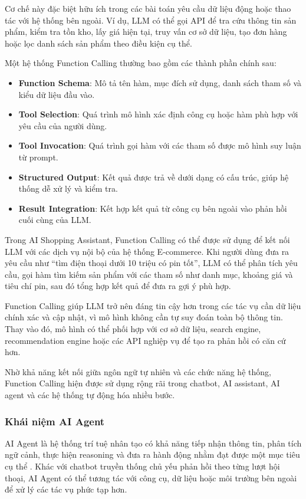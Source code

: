 Cơ chế này đặc biệt hữu ích trong các bài toán yêu cầu dữ liệu động hoặc thao tác với hệ thống bên ngoài. Ví dụ, LLM có thể gọi API để tra cứu thông tin sản phẩm, kiểm tra tồn kho, lấy giá hiện tại, truy vấn cơ sở dữ liệu, tạo đơn hàng hoặc lọc danh sách sản phẩm theo điều kiện cụ thể.

Một hệ thống Function Calling thường bao gồm các thành phần chính sau:

\begin{itemize}
    \item \textbf{Function Schema}: Mô tả tên hàm, mục đích sử dụng, danh sách tham số và kiểu dữ liệu đầu vào.
    \item \textbf{Tool Selection}: Quá trình mô hình xác định công cụ hoặc hàm phù hợp với yêu cầu của người dùng.
    \item \textbf{Tool Invocation}: Quá trình gọi hàm với các tham số được mô hình suy luận từ prompt.
    \item \textbf{Structured Output}: Kết quả được trả về dưới dạng có cấu trúc, giúp hệ thống dễ xử lý và kiểm tra.
    \item \textbf{Result Integration}: Kết hợp kết quả từ công cụ bên ngoài vào phản hồi cuối cùng của LLM.
\end{itemize}

Trong AI Shopping Assistant, Function Calling có thể được sử dụng để kết nối LLM với các dịch vụ nội bộ của hệ thống E-commerce. Khi người dùng đưa ra yêu cầu như ``tìm điện thoại dưới 10 triệu có pin tốt'', LLM có thể phân tích yêu cầu, gọi hàm tìm kiếm sản phẩm với các tham số như danh mục, khoảng giá và tiêu chí pin, sau đó tổng hợp kết quả để đưa ra gợi ý phù hợp.

Function Calling giúp LLM trở nên đáng tin cậy hơn trong các tác vụ cần dữ liệu chính xác và cập nhật, vì mô hình không cần tự suy đoán toàn bộ thông tin. Thay vào đó, mô hình có thể phối hợp với cơ sở dữ liệu, search engine, recommendation engine hoặc các API nghiệp vụ để tạo ra phản hồi có căn cứ hơn.

Nhờ khả năng kết nối giữa ngôn ngữ tự nhiên và các chức năng hệ thống, Function Calling hiện được sử dụng rộng rãi trong chatbot, AI assistant, AI agent và các hệ thống tự động hóa nhiều bước.

\subsubsection{Khái niệm AI Agent}

AI Agent là hệ thống trí tuệ nhân tạo có khả năng tiếp nhận thông tin, phân tích ngữ cảnh, thực hiện reasoning và đưa ra hành động nhằm đạt được một mục tiêu cụ thể \parencite{wooldridge2009introduction}. Khác với chatbot truyền thống chủ yếu phản hồi theo từng lượt hội thoại, AI Agent có thể tương tác với công cụ, dữ liệu hoặc môi trường bên ngoài để xử lý các tác vụ phức tạp hơn.

